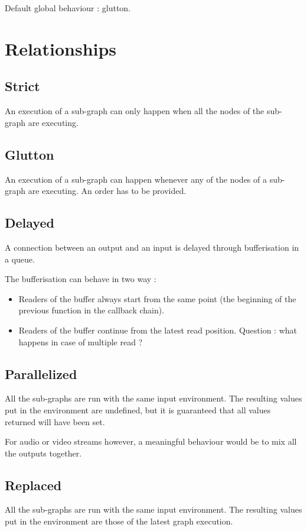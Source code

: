 \documentclass[a4paper,twocolumns]{article}
\begin{document}
    Default global behaviour : glutton.
   
	\section{Relationships}
    \subsection{Strict}
    An execution of a sub-graph can only happen when all the nodes of the sub-graph are executing.
    
	\subsection{Glutton}
	An execution of a sub-graph can happen whenever any of the nodes of a sub-graph are executing. 
	An order has to be provided.
    
    
	\subsection{Delayed}
	A connection between an output and an input is delayed through bufferisation in a queue.
	
	The bufferisation can behave in two way :
	\begin{itemize}
		\item Readers of the buffer always start from the same point (the beginning of the previous function in the callback chain).
		\item Readers of the buffer continue from the latest read position.
		Question : what happens in case of multiple read ?
	\end{itemize}
	
	
	\subsection{Parallelized}
	All the sub-graphs are run with the same input environment. 
	The resulting values put in the environment are undefined, but it is guaranteed that all values returned will have been set.
	
    For audio or video streams however, a meaningful behaviour would be to mix all the outputs together.
     
	\subsection{Replaced}
	All the sub-graphs are run with the same input environment. 
	The resulting values put in the environment are those of the latest graph execution.
	
\end{document}
